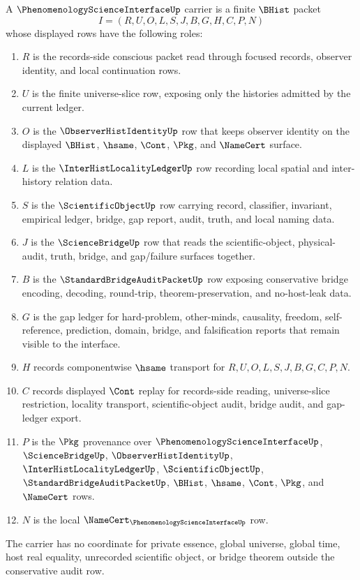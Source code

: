\begin{definition}
\label{def:phenomenology-science-interface-carrier}
A $\PhenomenologyScienceInterfaceUp$ carrier is a finite $\BHist$ packet
$$
I=(R,U,O,L,S,J,B,G,H,C,P,N)
$$
whose displayed rows have the following roles:
\begin{enumerate}
\item $R$ is the records-side conscious packet read through focused records, observer identity, and local continuation rows.
\item $U$ is the finite universe-slice row, exposing only the histories admitted by the current ledger.
\item $O$ is the $\ObserverHistIdentityUp$ row that keeps observer identity on the displayed $\BHist$, $\hsame$, $\Cont$, $\Pkg$, and $\NameCert$ surface.
\item $L$ is the $\InterHistLocalityLedgerUp$ row recording local spatial and inter-history relation data.
\item $S$ is the $\ScientificObjectUp$ row carrying record, classifier, invariant, empirical ledger, bridge, gap report, audit, truth, and local naming data.
\item $J$ is the $\ScienceBridgeUp$ row that reads the scientific-object, physical-audit, truth, bridge, and gap/failure surfaces together.
\item $B$ is the $\StandardBridgeAuditPacketUp$ row exposing conservative bridge encoding, decoding, round-trip, theorem-preservation, and no-host-leak data.
\item $G$ is the gap ledger for hard-problem, other-minds, causality, freedom, self-reference, prediction, domain, bridge, and falsification reports that remain visible to the interface.
\item $H$ records componentwise $\hsame$ transport for $R,U,O,L,S,J,B,G,C,P,N$.
\item $C$ records displayed $\Cont$ replay for records-side reading, universe-slice restriction, locality transport, scientific-object audit, bridge audit, and gap-ledger export.
\item $P$ is the $\Pkg$ provenance over $\PhenomenologyScienceInterfaceUp$, $\ScienceBridgeUp$, $\ObserverHistIdentityUp$, $\InterHistLocalityLedgerUp$, $\ScientificObjectUp$, $\StandardBridgeAuditPacketUp$, $\BHist$, $\hsame$, $\Cont$, $\Pkg$, and $\NameCert$ rows.
\item $N$ is the local $\NameCert_{\PhenomenologyScienceInterfaceUp}$ row.
\end{enumerate}
The carrier has no coordinate for private essence, global universe, global time, host real equality, unrecorded scientific object, or bridge theorem outside the conservative audit row.
\end{definition}

